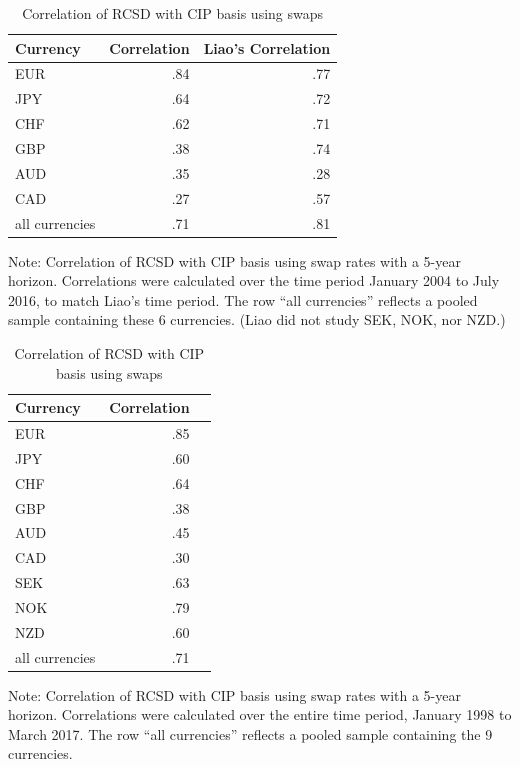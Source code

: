 \begin{table}[h]
\caption{\label{liao_correl_table} Correlation of RCSD with CIP basis using swaps}
\centering
\begin{tabular}{ |l|r|r| }
\hline
Currency & Correlation & Liao's Correlation \\
\hline
EUR & .84 & .77 \\
JPY & .64 & .72 \\
CHF & .62 & .71 \\
GBP & .38 & .74 \\
AUD & .35 & .28 \\
CAD & .27 & .57 \\
all currencies & .71 & .81 \\  %
\hline
\end{tabular}

\raggedright 
 Note: {\small Correlation of RCSD with CIP basis using swap rates with a 5-year horizon.  Correlations were calculated over the time period January 2004 to July 2016, to match Liao's time period.  The row ``all currencies'' reflects a pooled sample containing these 6 currencies. (Liao did not study SEK, NOK, nor NZD.)}
\end{table}


\begin{table}[h]
\caption{\label{liao_correl_table2} Correlation of RCSD with CIP basis using swaps}
\centering
\begin{tabular}{ |l|r|r| }
\hline
Currency & Correlation \\
\hline
EUR & .85 \\
JPY & .60  \\
CHF & .64 \\
GBP & .38 \\
AUD & .45 \\
CAD & .30 \\
SEK & .63 \\
NOK & .79 \\
NZD & .60 \\
all currencies & .71 \\
\hline
\end{tabular}

\raggedright 
 Note: {\small Correlation of RCSD with CIP basis using swap rates with a 5-year horizon.  Correlations were calculated over the entire time period, January 1998 to March 2017.   The row ``all currencies'' reflects a pooled sample containing the 9 currencies.}
\end{table}
 
